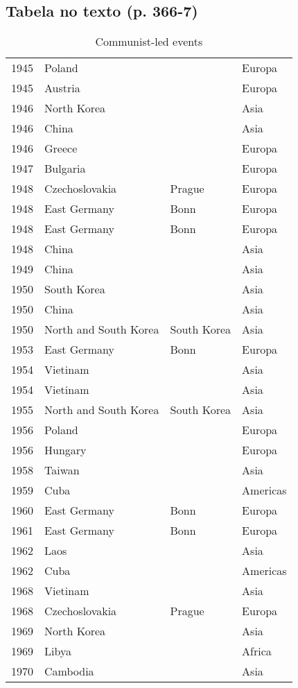 \documentclass[11pt]{article}
\begin{document}
\subsection*{Tabela no texto (p. 366-7)}
\label{sec:orgf1f94d6}
\begin{table}[htbp]
\caption{\label{violentos}Communist-led events}
\centering
\begin{tabular}{rlll}
\hline
1945 & Poland &  & Europa\\
1945 & Austria &  & Europa\\
1946 & North Korea &  & Asia\\
1946 & China &  & Asia\\
1946 & Greece &  & Europa\\
1947 & Bulgaria &  & Europa\\
1948 & Czechoslovakia & Prague & Europa\\
1948 & East Germany & Bonn & Europa\\
1948 & East Germany & Bonn & Europa\\
1948 & China &  & Asia\\
1949 & China &  & Asia\\
1950 & South Korea &  & Asia\\
1950 & China &  & Asia\\
1950 & North and South Korea & South Korea & Asia\\
1953 & East Germany & Bonn & Europa\\
1954 & Vietinam &  & Asia\\
1954 & Vietinam &  & Asia\\
1955 & North and South Korea & South Korea & Asia\\
1956 & Poland &  & Europa\\
1956 & Hungary &  & Europa\\
1958 & Taiwan &  & Asia\\
1959 & Cuba &  & Americas\\
1960 & East Germany & Bonn & Europa\\
1961 & East Germany & Bonn & Europa\\
1962 & Laos &  & Asia\\
1962 & Cuba &  & Americas\\
1968 & Vietinam &  & Asia\\
1968 & Czechoslovakia & Prague & Europa\\
1969 & North Korea &  & Asia\\
1969 & Libya &  & Africa\\
1970 & Cambodia &  & Asia\\

\end{tabular}
\end{table}
\end{document}
